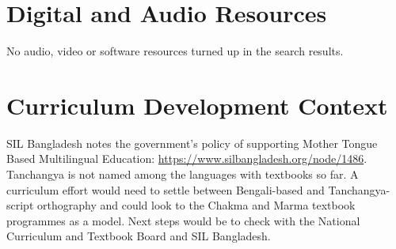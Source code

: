 \documentclass[12pt]{article}
\begin{document}
\section{Digital and Audio Resources}
No audio, video or software resources turned up in the search results.

\section{Curriculum Development Context}
SIL Bangladesh notes the government's policy of supporting Mother Tongue Based Multilingual Education: \url{https://www.silbangladesh.org/node/1486}. Tanchangya is not named among the languages with textbooks so far. A curriculum effort would need to settle between Bengali-based and Tanchangya-script orthography and could look to the Chakma and Marma textbook programmes as a model. Next steps would be to check with the National Curriculum and Textbook Board and SIL Bangladesh.
\end{document}
